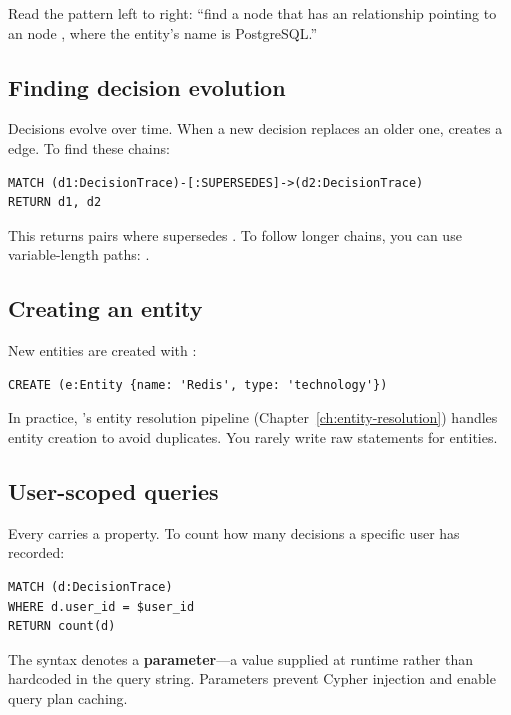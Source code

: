 Read the pattern left to right: ``find a  node  that
has an  relationship pointing to an  node ,
where the entity's name is PostgreSQL.''

\subsection{Finding decision evolution}

Decisions evolve over time. When a new decision replaces an older one,
\sysname{} creates a  edge. To find these chains:

\begin{lstlisting}[style=cypher]
MATCH (d1:DecisionTrace)-[:SUPERSEDES]->(d2:DecisionTrace)
RETURN d1, d2
\end{lstlisting}

This returns pairs where  supersedes . To follow longer chains,
you can use variable-length paths: .

\subsection{Creating an entity}

New entities are created with :

\begin{lstlisting}[style=cypher]
CREATE (e:Entity {name: 'Redis', type: 'technology'})
\end{lstlisting}

In practice, \sysname{}'s entity resolution pipeline (Chapter~\ref{ch:entity-resolution})
handles entity creation to avoid duplicates. You rarely write raw
 statements for entities.

\subsection{User-scoped queries}

Every  carries a  property. To count how many
decisions a specific user has recorded:

\begin{lstlisting}[style=cypher]
MATCH (d:DecisionTrace)
WHERE d.user_id = $user_id
RETURN count(d)
\end{lstlisting}

The  syntax denotes a \textbf{parameter}---a value supplied at
runtime rather than hardcoded in the query string. Parameters prevent Cypher
injection and enable query plan caching.

